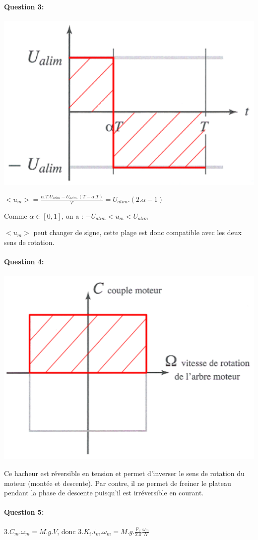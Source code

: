 \paragraph{Question 3:}

\begin{center}
 \includegraphics[width=0.6\linewidth]{img/td02_15}
\end{center}

$<u_m>=\frac{\alpha.T.U_{alim}-U_{alim}.(T-\alpha.T)}{T}=U_{alim}.(2.\alpha-1)$

Comme $\alpha\in[0,1]$, on a : $-U_{alim}<u_m<U_{alim}$

$<u_m>$ peut changer de signe, cette plage est donc compatible avec les deux sens de rotation.

\paragraph{Question 4:}

\begin{center}
 \includegraphics[width=0.3\linewidth]{img/td02_16}
\end{center}

Ce hacheur est réversible en tension et permet d'inverser le sens de rotation du moteur (montée et descente). Par contre, il ne permet de freiner le plateau pendant la phase de descente puisqu'il est irréversible en courant. 

\paragraph{Question 5:}

$3.C_m.\omega_m=M.g.V$, donc $3.K_i.i_m.\omega_m=M.g.\frac{p_v}{2.\pi}\frac{\omega_m}{N}$

